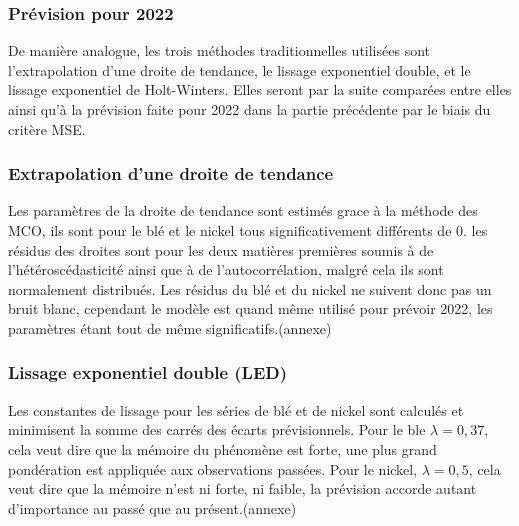 \subsubsection{Prévision pour 2022}
De manière analogue, les trois méthodes traditionnelles utilisées sont l'extrapolation d'une droite de tendance, le lissage exponentiel double, et 
le lissage exponentiel de Holt-Winters. Elles seront par la suite comparées entre elles ainsi qu'à la prévision faite pour 2022 dans la partie précédente par le biais du 
critère MSE.
\subsubsection*{Extrapolation d'une droite de tendance}
Les paramètres de la droite de tendance sont estimés grace à la méthode des MCO, ils sont pour le blé et le nickel tous significativement différents de 0. 
les résidus des droites sont pour les deux matières premières soumis à de l'hétéroscédasticité ainsi que à de l'autocorrélation, malgré cela ils sont normalement 
distribués. Les résidus du blé et du nickel ne suivent donc pas un bruit blanc, cependant le modèle est quand même utilisé pour prévoir 2022, les paramètres étant 
tout de même significatifs.(annexe)
\subsubsection*{Lissage exponentiel double (LED)}
Les constantes de lissage pour les séries de blé et de nickel sont calculés et minimisent la somme des carrés des écarts prévisionnels. Pour le ble $\lambda = 0,37$, cela 
veut dire que la mémoire du phénomène est forte, une plus grand pondération est appliquée aux observations passées. Pour le nickel, $\lambda = 0,5$, cela veut
dire que la mémoire n'est ni forte, ni faible, la prévision accorde autant d'importance au passé que au présent.(annexe)
